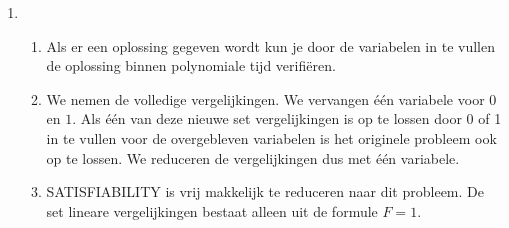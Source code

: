 \documentclass[11pt]{article}
\begin{document}
\begin{enumerate}
\begin{enumerate}
\begin{enumerate}[a]
                \end{enumerate}
            \item
                \begin{enumerate}[a]
                    \item
                        Als er een oplossing gegeven wordt kun je door de
                        variabelen in te vullen de oplossing binnen polynomiale
                        tijd verifi\"{e}ren.

                    \item
                        We nemen de volledige vergelijkingen. We vervangen
                        \'{e}\'{e}n variabele voor $0$ en $1$. Als één van deze
                        nieuwe set vergelijkingen is op te lossen door 0 of 1 in
                        te vullen voor de overgebleven variabelen is het
                        originele probleem ook op te lossen. We reduceren
                        de vergelijkingen dus met één variabele.

                    \item
                        SATISFIABILITY is vrij makkelijk te reduceren naar dit
                        probleem. De set lineare vergelijkingen bestaat alleen
                        uit de formule $F=1$.

                \end{enumerate}

        \end{enumerate}
\end{enumerate}
\end{document}
